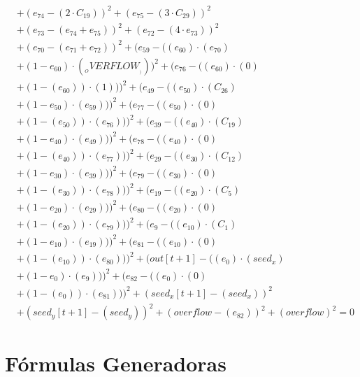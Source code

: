 \documentclass[10pt, a4paper]{article}
\begin{document}
\begin{align*}
& + (e_{74} - (2  \cdot  C_{19}))^{2} + (e_{75} - (3  \cdot  C_{29}))^{2} \\
& + (e_{73} - (e_{74} + e_{75}))^{2} + (e_{72} - (4  \cdot  e_{73}))^{2} \\
& + (e_{70} - (e_{71} + e_{72}))^{2} + (e_{59} - ((e_{60})  \cdot  (e_{70}) \\
& + (1 - e_{60})  \cdot  (__OVERFLOW__)))^{2} + (e_{76} - ((e_{60}) \cdot (0) \\
& + (1 - (e_{60})) \cdot (1)))^{2} + (e_{49} - ((e_{50})  \cdot  (C_{26}) \\
& + (1 - e_{50})  \cdot  (e_{59})))^{2} + (e_{77} - ((e_{50}) \cdot (0) \\
& + (1 - (e_{50})) \cdot (e_{76})))^{2} + (e_{39} - ((e_{40})  \cdot  (C_{19}) \\
& + (1 - e_{40})  \cdot  (e_{49})))^{2} + (e_{78} - ((e_{40}) \cdot (0) \\
& + (1 - (e_{40})) \cdot (e_{77})))^{2} + (e_{29} - ((e_{30})  \cdot  (C_{12}) \\
& + (1 - e_{30})  \cdot  (e_{39})))^{2} + (e_{79} - ((e_{30}) \cdot (0) \\
& + (1 - (e_{30})) \cdot (e_{78})))^{2} + (e_{19} - ((e_{20})  \cdot  (C_{5}) \\
& + (1 - e_{20})  \cdot  (e_{29})))^{2} + (e_{80} - ((e_{20}) \cdot (0) \\
& + (1 - (e_{20})) \cdot (e_{79})))^{2} + (e_{9} - ((e_{10})  \cdot  (C_{1}) \\
& + (1 - e_{10})  \cdot  (e_{19})))^{2} + (e_{81} - ((e_{10}) \cdot (0) \\
& + (1 - (e_{10})) \cdot (e_{80})))^{2} + (out[t+1] - ((e_{0})  \cdot  (seed_x) \\
& + (1 - e_{0})  \cdot  (e_{9})))^{2} + (e_{82} - ((e_{0}) \cdot (0) \\
& + (1 - (e_{0})) \cdot (e_{81})))^{2} + (seed_x[t+1] - (seed_x))^{2} \\
& + (seed_y[t+1] - (seed_y))^{2} + (overflow - (e_{82}))^{2} + (overflow)^{2} = 0
\end{align*}\part{Fórmulas Generadoras}
\end{document}

